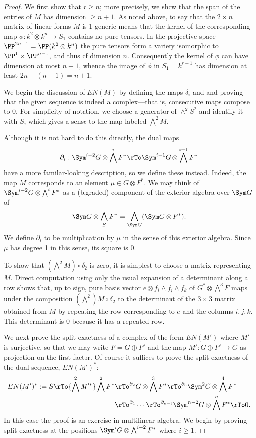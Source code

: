 \begin{proof} We first show that $r\geq n$; more precisely, we show that the span of the entries of $M$ has dimension $\geq n+1$. As noted above, to say that the $2\times n$ matrix of linear forms $M$ is 1-generic means that
the kernel of the corresponding map $ \phi: k^2\otimes k^n \to S_1$ contains no pure tensors. In the projective
space $\PP^{2n-1} = \PP(k^2\otimes k^n)$ the pure tensors form a variety isomorphic to $\PP^1\times \PP^{n-1}$, and thus of dimension $n$. Consequently the kernel of $\phi$ can have dimension at most $n-1$, whence the image of $\phi$ 
in $S_1 = k^{r+1}$ has dimension at least $2n-(n-1) = n+1$. 

We begin the discussion of $EN(M)$ by defining the maps $\delta_i$ and and proving that the given sequence is indeed a complex---that is, consecutive maps compose to 0. For simplicity of notation, we choose a generator of $\wedge^2 S^2$
 and identify it with $S$, which gives a sense to the map labeled $\bigwedge^2M$.
 
  Although it is not hard to do this directly, the dual maps
 $$
 \partial_i: \Sym^{i-2} G \otimes \bigwedge^i F^* \rTo \Sym^{i-1} G \otimes \bigwedge^{i+1} F^*
 $$
 have a more familar-looking description, so we define these instead. Indeed, the map $M$ corresponds to an
 element $\mu\in G\otimes F^*$. We may think of $ \Sym^{i-2} G \otimes \bigwedge^i  F^*$
 as a (bigraded) component of the exterior algebra over $ \Sym G$ of 
 $$
  \Sym G \otimes \bigwedge_S  F^*= \bigwedge_{ \Sym G} (\Sym G \otimes  F^*).
 $$
We define $\partial_i$ to be  multiplication by $\mu$ in the sense of this exterior algebra. Since $\mu$ has degree 1
in this sense, its square is 0. 

To show that $(\bigwedge^2 M)\circ \delta_2$ is zero, it is simplest to choose a matrix representing $M$.
Direct computation using only the usual expansion of a determinant
along a row shows that, up to sign,
pure basis vector $e\otimes f_i\wedge f_j\wedge f_k$ of $G^*\otimes \bigwedge^3 F$
maps under the composition $(\bigwedge^2) M\circ \delta_2$ to the determinant
of the $3\times 3$ matrix obtained from $M$ by repeating the row corresponding to $e$ and
the columns $i,j,k$. This determinant is 0 because it has a repeated row.

We next prove the split exactness of a complex of the form $EN(M')$ where $M'$ is surjective, so that we
may write $F = G\oplus F'$ and the map $M': G\oplus F' \to G$ as projection on the first factor. 
Of course
it suffices to prove the split exactness of the dual sequence, $EN(M')^*$:
\begin{align*}
EN(M')^* := 
S \rTo{\bigwedge^2 M'^*} 
 \bigwedge^2 F^*&
 \rTo^{\partial_{2}}
 G\otimes \bigwedge^3 F^*  
 \rTo^{\partial_{3}}
  \Sym^2G\otimes\bigwedge^4F^*  \\
 &\rTo^{\partial_{4}}\cdots\rTo^{\partial_{n-1}} 
\Sym^{n-2}G\otimes\bigwedge^nF^* 
 \rTo 0.
\end{align*}
In this case the proof
is an exercise in multilinear algebra. 
We begin by proving split exactness at the 
positions $\Sym^{i} G \otimes \bigwedge^{i+2}  F^*$ where $i\geq 1$.


\end{proof}
